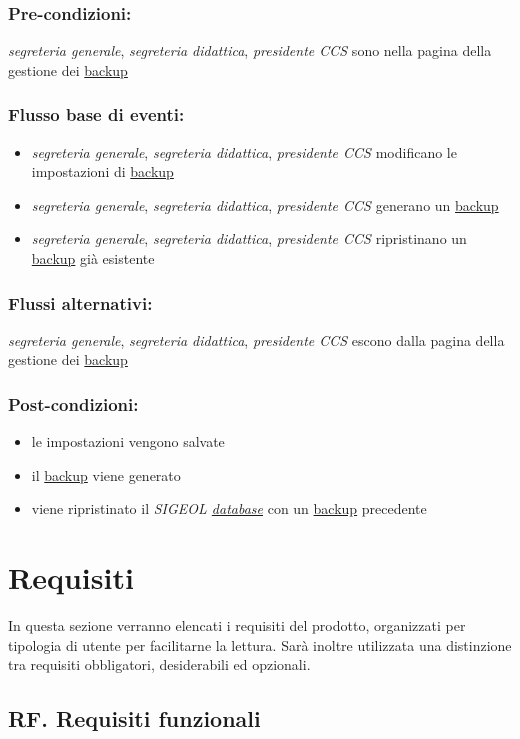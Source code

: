 \documentclass[11pt,a4paper]{article}
\begin{document}
\subsubsection*{Pre-condizioni:}
\textit{segreteria generale}, \textit{segreteria didattica}, \textit{presidente CCS} sono nella pagina della gestione dei \underline{backup}
\subsubsection*{Flusso base di eventi:}
\begin{itemize}
 \item \textit{segreteria generale}, \textit{segreteria didattica}, \textit{presidente CCS} modificano le impostazioni di \underline{backup}
 \item \textit{segreteria generale}, \textit{segreteria didattica}, \textit{presidente CCS} generano un \underline{backup}
 \item \textit{segreteria generale}, \textit{segreteria didattica}, \textit{presidente CCS} ripristinano un \underline{backup} già esistente
\end{itemize}
\subsubsection*{Flussi alternativi:}
\textit{segreteria generale}, \textit{segreteria didattica}, \textit{presidente CCS} escono dalla pagina della gestione dei \underline{backup}
\subsubsection*{Post-condizioni:}
\begin{itemize}
\item le impostazioni vengono salvate
\item il \underline{backup} viene generato
\item viene ripristinato il \textit{SIGEOL \underline{database}} con un \underline{backup} precedente
\end{itemize}
\section{Requisiti} \label{requisiti}
In questa sezione verranno elencati i requisiti del prodotto, organizzati per tipologia di utente per facilitarne la lettura. Sarà inoltre utilizzata una distinzione tra requisiti obbligatori, desiderabili ed opzionali.
\subsection{RF. Requisiti funzionali}
\end{document}
